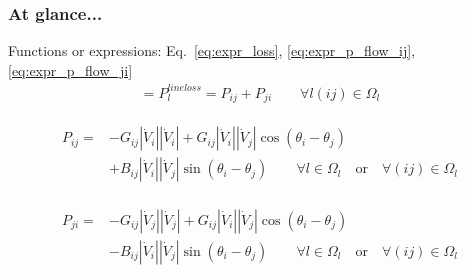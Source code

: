 \documentclass[
	11pt, %
	aspectratio=169, %
]{beamer}
\begin{document}

\begin{frame}
	\frametitle{At glance...}
	
	Functions or expressions: Eq.~\eqref{eq:expr_loss}, \eqref{eq:expr_p_flow_ij}, \eqref{eq:expr_p_flow_ji}
	\begin{align*}
		[-G_{ij}(\left|\dot{V}_{i} \right|^2 + \left|\dot{V}_{j} \right|^2) + 2G_{ij}\left|\dot{V}_{i} \right|\left|\dot{V}_{j} \right|\cos\left(\theta_{i}-\theta_{j} \right) ] =P_{l}^{line loss}= P_{ij} + P_{ji} \quad \quad \forall l(ij) \in \Omega_{l}
	\end{align*}

	\begin{align*}
		\begin{split}
		P_{ij} = &-G_{ij} \left|\dot{V}_{i} \right| \left|\dot{V}_{i} \right| 
		+ G_{ij} \left|\dot{V}_{i} \right| \left|\dot{V}_{j} \right| \cos\left(\theta_{i}-\theta_{j} \right) \\
		&+ B_{ij} \left|\dot{V}_{i} \right| \left|\dot{V}_{j} \right| \sin\left(\theta_{i}-\theta_{j} \right) 
		\quad \quad \forall l \in \Omega_{l} \quad \text{or} \quad \forall (ij) \in \Omega_{l}
		\end{split}
	\end{align*}

	\begin{align*}
		\begin{split}
		P_{ji}=&-G_{ij} \left|\dot{V}_{j} \right| \left|\dot{V}_{j} \right| 
		+ G_{ij} \left|\dot{V}_{i} \right| \left|\dot{V}_{j} \right| \cos\left(\theta_{i}-\theta_{j} \right)\\
		&- B_{ij} \left|\dot{V}_{i} \right| \left|\dot{V}_{j} \right| \sin\left(\theta_{i}-\theta_{j} \right)
		\quad \quad \forall l \in \Omega_{l} \quad \text{or} \quad \forall (ij) \in \Omega_{l}
		\end{split}
	\end{align*}

	
\end{frame}

\end{document}
